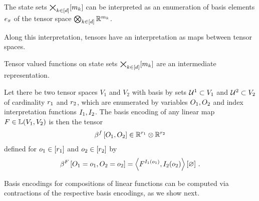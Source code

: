 The state sets $\bigtimes_{k\in[d]}[m_{k}]$ can be interpreted as an enumeration of basis elements $e_{x}$ of the tensor space $\bigotimes_{k\in[d]} \mathbb{R}^{m_{k}}$.

Along this interpretation, tensors have an interpretation as maps between tensor spaces.


Tensor valued functions on state sets $\bigtimes_{k\in[d]}[m_{k}]$ are an intermediate representation.

\begin{definition}
    Let there be two tensor spaces $V_1$ and $V_2$ with basis by sets $\mathcal{U}^{1}\subset V_1$ and $\mathcal{U}^{2}\subset V_2$ of cardinality $r_{1}$ and $r_{2}$, which are enumerated by variables $O_{1},O_{2}$ and index interpretation functions $I_{1},I_{2}$.
    The basis encoding of any linear map $F\in\mathbb{L}(V_1,V_2)$ is then the tensor
    \begin{align*}
        \beta^{f}\left[O_{1},O_{2}\right] \in \mathbb{R}^{r_{1}} \otimes \mathbb{R}^{r_{2}}
    \end{align*}
    defined for $o_{1}\in[r_{1}]$ and $o_{2}\in[r_{2}]$ by
    \begin{align*}
        \beta^{F}\left[O_{1}=o_{1},O_{2}=o_{2}\right]
        = \left\langle F^{I_{1}(o_{1})},I_{2}(o_{2})\right\rangle \left[ \varnothing \right] \, .
    \end{align*}
\end{definition}

Basis encodings for compositions of linear functions can be computed via contractions of the respective basis encodings, as we show next.

